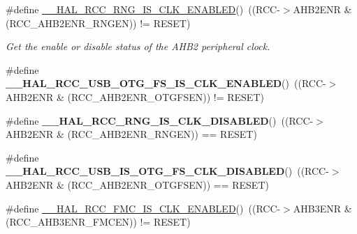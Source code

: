 \begin{DoxyCompactItemize}
\item 
\#define \mbox{\hyperlink{group___r_c_c_ex___peripheral___clock___enable___disable___status_gabb083459b7bbd56c9b89db59bb75fdc2}{\+\_\+\+\_\+\+H\+A\+L\+\_\+\+R\+C\+C\+\_\+\+R\+N\+G\+\_\+\+I\+S\+\_\+\+C\+L\+K\+\_\+\+E\+N\+A\+B\+L\+ED}}()~((R\+CC-\/$>$A\+H\+B2\+E\+NR \& (R\+C\+C\+\_\+\+A\+H\+B2\+E\+N\+R\+\_\+\+R\+N\+G\+EN)) != R\+E\+S\+ET)
\begin{DoxyCompactList}\small\item\em Get the enable or disable status of the A\+H\+B2 peripheral clock. \end{DoxyCompactList}\item 
\mbox{\label{group___r_c_c_ex___peripheral___clock___enable___disable___status_gaa4b2148406841d5459e86a25c277e0a3}} 
\#define {\bfseries \+\_\+\+\_\+\+H\+A\+L\+\_\+\+R\+C\+C\+\_\+\+U\+S\+B\+\_\+\+O\+T\+G\+\_\+\+F\+S\+\_\+\+I\+S\+\_\+\+C\+L\+K\+\_\+\+E\+N\+A\+B\+L\+ED}()~((R\+CC-\/$>$A\+H\+B2\+E\+NR \& (R\+C\+C\+\_\+\+A\+H\+B2\+E\+N\+R\+\_\+\+O\+T\+G\+F\+S\+EN)) != R\+E\+S\+ET)
\item 
\mbox{\label{group___r_c_c_ex___peripheral___clock___enable___disable___status_ga9b17b31dc3e560ead96b7d8a74c8c679}} 
\#define {\bfseries \+\_\+\+\_\+\+H\+A\+L\+\_\+\+R\+C\+C\+\_\+\+R\+N\+G\+\_\+\+I\+S\+\_\+\+C\+L\+K\+\_\+\+D\+I\+S\+A\+B\+L\+ED}()~((R\+CC-\/$>$A\+H\+B2\+E\+NR \& (R\+C\+C\+\_\+\+A\+H\+B2\+E\+N\+R\+\_\+\+R\+N\+G\+EN)) == R\+E\+S\+ET)
\item 
\mbox{\label{group___r_c_c_ex___peripheral___clock___enable___disable___status_gaba93147e1e153d37a4a82e979de6d53e}} 
\#define {\bfseries \+\_\+\+\_\+\+H\+A\+L\+\_\+\+R\+C\+C\+\_\+\+U\+S\+B\+\_\+\+I\+S\+\_\+\+O\+T\+G\+\_\+\+F\+S\+\_\+\+C\+L\+K\+\_\+\+D\+I\+S\+A\+B\+L\+ED}()~((R\+CC-\/$>$A\+H\+B2\+E\+NR \& (R\+C\+C\+\_\+\+A\+H\+B2\+E\+N\+R\+\_\+\+O\+T\+G\+F\+S\+EN)) == R\+E\+S\+ET)
\item 
\#define \mbox{\hyperlink{group___r_c_c_ex___peripheral___clock___enable___disable___status_ga93863872b8bedab2b9714ad82f672f3d}{\+\_\+\+\_\+\+H\+A\+L\+\_\+\+R\+C\+C\+\_\+\+F\+M\+C\+\_\+\+I\+S\+\_\+\+C\+L\+K\+\_\+\+E\+N\+A\+B\+L\+ED}}()~((R\+CC-\/$>$A\+H\+B3\+E\+NR \& (R\+C\+C\+\_\+\+A\+H\+B3\+E\+N\+R\+\_\+\+F\+M\+C\+EN)) != R\+E\+S\+ET)

\end{DoxyCompactItemize}
